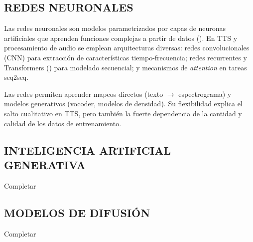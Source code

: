 \subsection{REDES NEURONALES}
Las redes neuronales son modelos parametrizados por capas de neuronas artificiales que aprenden funciones complejas a partir de datos (\cite{goodfellow}).
En TTS y procesamiento de audio se emplean arquitecturas diversas: redes convolucionales (CNN) para extracción de características tiempo-frecuencia; redes recurrentes y Transformers (\cite{attention}) para modelado secuencial; y mecanismos de \emph{attention} en tareas seq2seq.

Las redes permiten aprender mapeos directos (texto $\rightarrow$ espectrograma) y modelos generativos (vocoder, modelos de densidad). Su flexibilidad explica el salto cualitativo en TTS, pero también la fuerte dependencia de la cantidad y calidad de los datos de entrenamiento.

\subsection{INTELIGENCIA ARTIFICIAL GENERATIVA}
Completar

\subsection{MODELOS DE DIFUSIÓN}
Completar

